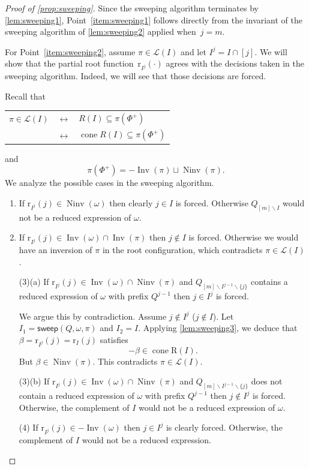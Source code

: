 \documentclass[reqno]{amsart}
\theoremstyle{definition}
\newcommand{\ssm}{\smallsetminus} %
\DeclareMathOperator{\cone}{cone} %
\DeclareMathOperator{\Inv}{Inv} %
\DeclareMathOperator{\Ninv}{Ninv} %
\newcommand{\linearExtensions}{\mathcal{L}} %
\newcommand{\Roots}{\mathrm{R}} %
\newcommand{\rootFunction}[2]{\mathrm{r}_{#1}(#2)} %
\newcommand{\sweepingAlgorithm}{\mathsf{sweep}} %
\begin{document}
\begin{proof}[Proof of \cref{prop:sweeping}]
Since the sweeping algorithm terminates by \cref{lem:sweeping1}, Point~\eqref{item:sweeping1} follows directly from the invariant of the sweeping algorithm of \cref{lem:sweeping2} applied when~$j = m$.

For Point~\eqref{item:sweeping2}, assume $\pi \in \linearExtensions(I)$ and let $I^j=I\cap [j]$.
We will show that the partial root function~$\rootFunction{I^j}{\cdot}$ agrees with the decisions taken in the sweeping algorithm.
Indeed, we will see that those decisions are forced.

Recall that 
\begin{center}
\begin{tabular}{ccl}
    $\pi \in \linearExtensions(I)$ & $\longleftrightarrow$ & $R(I)\subseteq \pi(\Phi^+)$\\
     & $\longleftrightarrow$ & $\cone R(I)\subseteq \pi(\Phi^+)$
\end{tabular}    
\end{center}
and 
\[
\pi(\Phi^+) = -\Inv(\pi) \sqcup \Ninv(\pi).
\]
We analyze the possible cases in the sweeping algorithm.

\begin{enumerate}
    \item If $\rootFunction{I^j}{j}\in \Ninv(\omega)$ then clearly $j\in I$ is forced. Otherwise $Q_{[m]\ssm I}$ would not be a reduced expression of $\omega$.
    \item If $\rootFunction{I^j}{j}\in \Inv(\omega) \cap \Inv(\pi)$ then $j\notin I$ is forced. 
    Otherwise we would have an inversion of $\pi$ in the root configuration, which contradicts $\pi \in \linearExtensions(I)$.
    \item[(3)(a)] If $\rootFunction{I^j}{j}\in \Inv(\omega) \cap \Ninv(\pi)$ and $Q_{[m]\ssm I^{j-1}\ssm \{j\}}$ contains a reduced expression of $\omega$ with prefix $Q^{j-1}$ then $j\in I^j$ is forced. 

    We argue this by contradiction. 
    Assume $j\notin I^j$ ($j\notin I$). Let $I_1=\sweepingAlgorithm(Q,\omega,\pi)$ and $I_2=I$. Applying \cref{lem:sweeping3}, we deduce that $\beta=\rootFunction{I^j}{j}=\rootFunction{I}{j}$ satisfies 
    \[
    -\beta \in \cone \Roots(I).
    \]
    But $\beta \in \Ninv(\pi)$. This contradicts $\pi\in \linearExtensions(I)$.
    \item[(3)(b)]  If $\rootFunction{I^j}{j}\in \Inv(\omega) \cap \Ninv(\pi)$ and $Q_{[m]\ssm I^{j-1}\ssm \{j\}}$ does not contain a reduced expression of $\omega$ with prefix $Q^{j-1}$ then $j\notin I^j$ is forced. Otherwise, the complement of $I$ would not be a reduced expression of $\omega$.
    \item[(4)] If $\rootFunction{I^j}{j}\in -\Inv(\omega)$ then $j\in I^j$ is clearly forced. Otherwise, the complement of $I$ would not be a reduced expression.
    \qedhere
\end{enumerate}
\end{proof}
\end{document}
